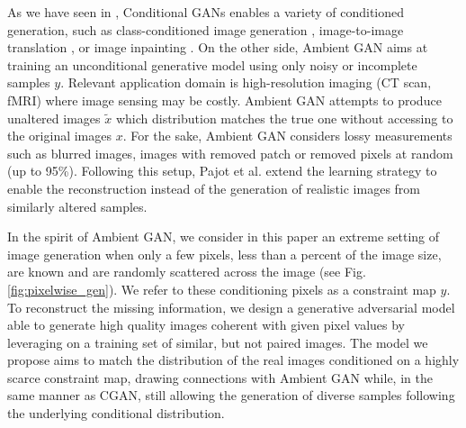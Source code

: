 
As we have seen in , Conditional GANs enables a variety of conditioned generation, such as class-conditioned image generation \citep{Mirza2014}, image-to-image translation \citep{Isola2016, Wang2018}, or image inpainting \citep{Pathak2016}. On the other side, Ambient GAN \citep{Bora2018} aims at training an unconditional generative model using only noisy or incomplete samples $y$. Relevant application domain is high-resolution imaging (CT scan, fMRI) where image sensing may be costly. Ambient GAN attempts to produce unaltered images $\tilde{x}$ which distribution matches the true one without accessing to the original images $x$. For the sake, Ambient GAN considers lossy measurements such as blurred images, images with removed patch or removed pixels at random (up to 95\%). Following this setup, Pajot et al.\citep{Pajot2019} extend the learning strategy to enable the reconstruction instead of the generation of realistic images from similarly altered samples. 

In the spirit of Ambient GAN,  we consider in this paper an extreme setting of image generation when only a few pixels, less than a percent of the  image size, are known and are randomly scattered across the image (see Fig.\ref{fig:pixelwise_gen}). We refer to these conditioning pixels as a constraint map $y$. To reconstruct the missing information, we design a generative adversarial model able to generate high quality images coherent with given pixel values by leveraging on a training set of similar, but not paired images. The model we propose aims to match the distribution of the real images conditioned on a highly scarce constraint map, drawing connections with Ambient GAN while, in the same manner as CGAN, still allowing the generation of diverse samples following the underlying conditional distribution. 


